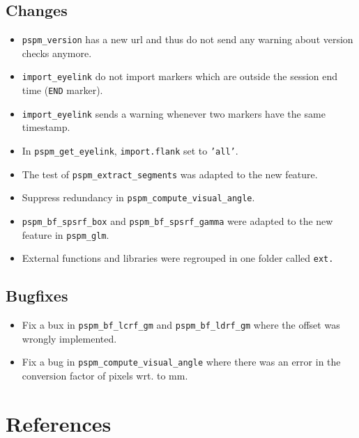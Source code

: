 \documentclass[english]{article}
\numberwithin{equation}{section}
\numberwithin{figure}{section}
\begin{document}
\subsection*{Changes}
\begin{itemize}
\item \texttt{pspm\_version} has a new url and thus do not send any warning
about version checks anymore.
\item \texttt{import\_eyelink} do not import markers which are outside the
session end time (\texttt{END} marker).
\item \texttt{import\_eyelink} sends a warning whenever two markers have
the same timestamp.
\item In \texttt{pspm\_get\_eyelink}, \texttt{import.flank} set to \texttt{'all'}.
\item The test of \texttt{pspm\_extract\_segments} was adapted to the new
feature.
\item Suppress redundancy in \texttt{pspm\_compute\_visual\_angle}.
\item \texttt{pspm\_bf\_spsrf\_box} and \texttt{pspm\_bf\_spsrf\_gamma}
were adapted to the new feature in \texttt{pspm\_glm}.
\item External functions and libraries were regrouped in one folder called
\texttt{ext.}
\end{itemize}

\subsection*{Bugfixes}
\begin{itemize}
\item Fix a bux in \texttt{pspm\_bf\_lcrf\_gm} and \texttt{pspm\_bf\_ldrf\_gm}
where the offset was wrongly implemented.
\item Fix a bug in \texttt{pspm\_compute\_visual\_angle} where there was
an error in the conversion factor of pixels wrt. to mm.
\end{itemize}

\section{References}



\end{document}
